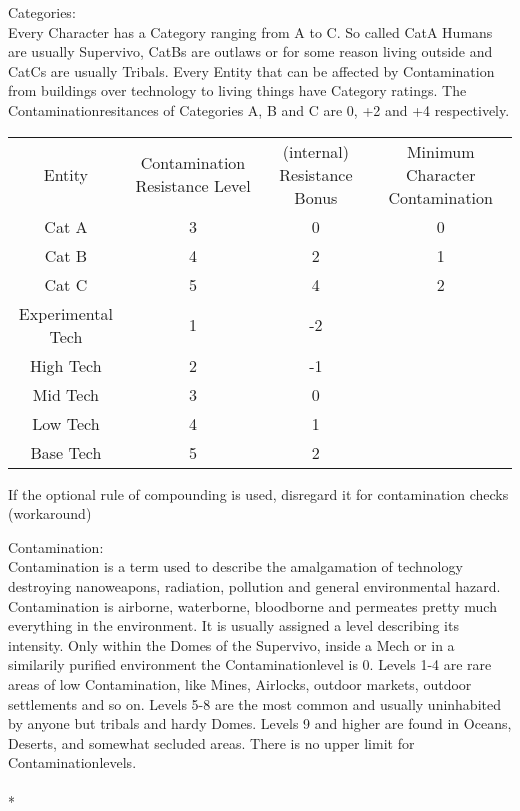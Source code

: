 \documentclass{article}
\begin{document}
    Categories:\\
    Every Character has a Category ranging from A to C. So called CatA Humans are usually Supervivo, CatBs are outlaws or
    for some reason living outside and CatCs are usually Tribals.
    Every Entity that can be affected by Contamination from buildings over technology to living things have Category ratings.
    The Contaminationresitances of Categories A, B and C are 0, +2 and +4 respectively.\\\newline
    \begin{tabular}{c|ccc}
        Entity & Contamination Resistance Level & (internal) Resistance Bonus & Minimum Character Contamination\\
        Cat A & 3 & 0 & 0\\
        Cat B & 4 & 2 & 1\\
        Cat C & 5 & 4 & 2\\
        Experimental Tech & 1 & -2 \\
        High Tech & 2 & -1 \\
        Mid Tech & 3 & 0\\
        Low Tech & 4 & 1 \\
        Base Tech & 5 & 2 \\
    \end{tabular}\newline\newline
    If the optional rule of compounding is used, disregard it for contamination checks (workaround)\\\newline

    Contamination: \\
    Contamination is a term used to describe the amalgamation of technology destroying nanoweapons, radiation, pollution
    and general environmental hazard. Contamination is airborne, waterborne, bloodborne and permeates pretty much
    everything in the environment. It is usually assigned a level describing its intensity. Only within the Domes
    of the Supervivo, inside a Mech or in a similarily purified environment the Contaminationlevel is 0. Levels 1-4 are
    rare areas of low Contamination, like Mines, Airlocks, outdoor markets, outdoor settlements and so on. Levels 5-8
    are the most common and usually uninhabited by anyone but tribals and hardy Domes. Levels 9 and higher are found in
    Oceans, Deserts, and somewhat secluded areas. There is no upper limit for Contaminationlevels. \\\\*
\end{document}
